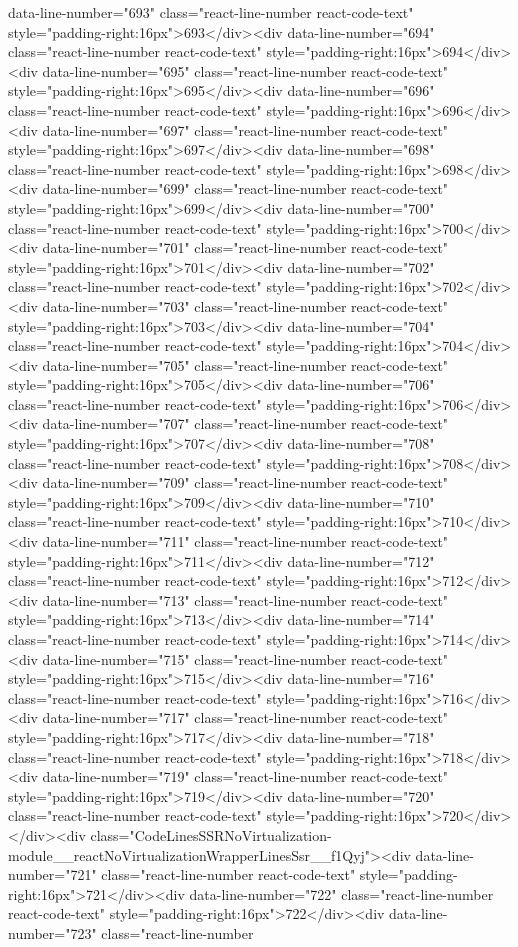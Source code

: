 {{{{{{{data-line-number="693" class="react-line-number react-code-text" style="padding-right:16px">693</div><div data-line-number="694" class="react-line-number react-code-text" style="padding-right:16px">694</div><div data-line-number="695" class="react-line-number react-code-text" style="padding-right:16px">695</div><div data-line-number="696" class="react-line-number react-code-text" style="padding-right:16px">696</div><div data-line-number="697" class="react-line-number react-code-text" style="padding-right:16px">697</div><div data-line-number="698" class="react-line-number react-code-text" style="padding-right:16px">698</div><div data-line-number="699" class="react-line-number react-code-text" style="padding-right:16px">699</div><div data-line-number="700" class="react-line-number react-code-text" style="padding-right:16px">700</div><div data-line-number="701" class="react-line-number react-code-text" style="padding-right:16px">701</div><div data-line-number="702" class="react-line-number react-code-text" style="padding-right:16px">702</div><div data-line-number="703" class="react-line-number react-code-text" style="padding-right:16px">703</div><div data-line-number="704" class="react-line-number react-code-text" style="padding-right:16px">704</div><div data-line-number="705" class="react-line-number react-code-text" style="padding-right:16px">705</div><div data-line-number="706" class="react-line-number react-code-text" style="padding-right:16px">706</div><div data-line-number="707" class="react-line-number react-code-text" style="padding-right:16px">707</div><div data-line-number="708" class="react-line-number react-code-text" style="padding-right:16px">708</div><div data-line-number="709" class="react-line-number react-code-text" style="padding-right:16px">709</div><div data-line-number="710" class="react-line-number react-code-text" style="padding-right:16px">710</div><div data-line-number="711" class="react-line-number react-code-text" style="padding-right:16px">711</div><div data-line-number="712" class="react-line-number react-code-text" style="padding-right:16px">712</div><div data-line-number="713" class="react-line-number react-code-text" style="padding-right:16px">713</div><div data-line-number="714" class="react-line-number react-code-text" style="padding-right:16px">714</div><div data-line-number="715" class="react-line-number react-code-text" style="padding-right:16px">715</div><div data-line-number="716" class="react-line-number react-code-text" style="padding-right:16px">716</div><div data-line-number="717" class="react-line-number react-code-text" style="padding-right:16px">717</div><div data-line-number="718" class="react-line-number react-code-text" style="padding-right:16px">718</div><div data-line-number="719" class="react-line-number react-code-text" style="padding-right:16px">719</div><div data-line-number="720" class="react-line-number react-code-text" style="padding-right:16px">720</div></div><div class="CodeLinesSSRNoVirtualization-module__reactNoVirtualizationWrapperLinesSsr__f1Qyj"><div data-line-number="721" class="react-line-number react-code-text" style="padding-right:16px">721</div><div data-line-number="722" class="react-line-number react-code-text" style="padding-right:16px">722</div><div data-line-number="723" class="react-line-number }}}}}}}
